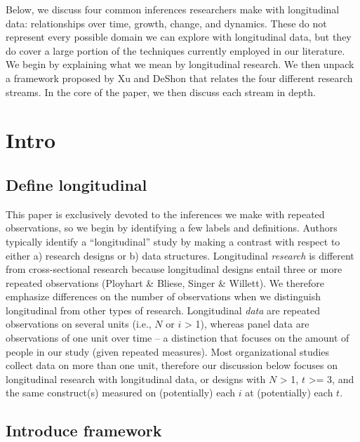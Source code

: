 \documentclass[english,,man]{apa6}
\theoremstyle{definition}
\theoremstyle{definition}
\theoremstyle{definition}
\theoremstyle{remark}
\begin{document}
Below, we discuss four common inferences researchers make with
longitudinal data: relationships over time, growth, change, and
dynamics. These do not represent every possible domain we can explore
with longitudinal data, but they do cover a large portion of the
techniques currently employed in our literature. We begin by explaining
what we mean by longitudinal research. We then unpack a framework
proposed by Xu and DeShon that relates the four different research
streams. In the core of the paper, we then discuss each stream in depth.

\hypertarget{intro}{%
\section{Intro}\label{intro}}

\hypertarget{define-longitudinal}{%
\subsection{Define longitudinal}\label{define-longitudinal}}

This paper is exclusively devoted to the inferences we make with
repeated observations, so we begin by identifying a few labels and
definitions. Authors typically identify a \enquote{longitudinal} study
by making a contrast with respect to either a) research designs or b)
data structures. Longitudinal \emph{research} is different from
cross-sectional research because longitudinal designs entail three or
more repeated observations (Ployhart \& Bliese, Singer \& Willett). We
therefore emphasize differences on the number of observations when we
distinguish longitudinal from other types of research. Longitudinal
\emph{data} are repeated observations on several units (i.e., \(N\) or
\(i\) \textgreater{} 1), whereas panel data are observations of one unit
over time -- a distinction that focuses on the amount of people in our
study (given repeated measures). Most organizational studies collect
data on more than one unit, therefore our discussion below focuses on
longitudinal research with longitudinal data, or designs with \(N\)
\textgreater{} 1, \(t\) \textgreater{}= 3, and the same construct(s)
measured on (potentially) each \(i\) at (potentially) each \(t\).

\hypertarget{introduce-framework}{%
\subsection{Introduce framework}\label{introduce-framework}}
\end{document}
